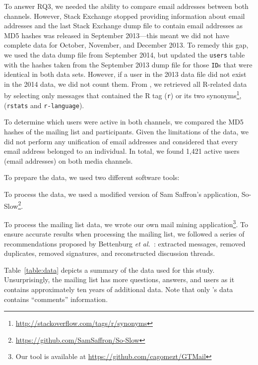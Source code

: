     
To answer RQ3, we needed the ability to compare email addresses between both channels. However, Stack Exchange stopped providing information about email addresses and the last Stack Exchange dump file to contain email addresses as MD5 hashes was released in September 2013---this meant we did not have complete data for October, November, and December 2013. 
To remedy this gap, we used the data dump file from September 2014, but updated the \texttt{users} table with the hashes taken from the September 2013 dump file for those \texttt{ID}s that were identical in both data sets.
However, if a user in the 2013 data file did not exist in the 2014 data, we did not count them.
From \SO, we retrieved all R-related data by selecting only messages that contained the R tag (\texttt{r}) or its two synonyms\footnote{\url{http://stackoverflow.com/tags/r/synonyms}}, (\texttt{rstats} and \texttt{r-language}).

To determine which users were active in both channels, we compared the MD5 hashes of the \RH mailing list and \SO participants. Given the limitations of the \SO data, we did not perform any unification of email addresses and considered that every email address belonged to an individual. In total, we found 1,421 active users (email addresses) on both media channels.


To prepare the data, we used two different software tools:
    \begin{enumerate*}[label=(\arabic*)]
    \item To process the \SO data, we used a modified version of Sam Saffron's application, So-Slow\footnote{\url{https://github.com/SamSaffron/So-Slow}}.
    \item To process the \RH mailing list data, we wrote our own mail mining application\footnote{Our tool is available at
            \url{https://github.com/cagomezt/GTMail}}. To ensure accurate results when processing the \RH mailing list, we followed a series of recommendations proposed by Bettenburg \textit{et al.}~\cite{Bettenburg2009}: extracted messages, removed duplicates, removed signatures, and reconstructed discussion threads.
    \end{enumerate*}
Table~\ref{table:data} depicts a summary of the data used for this study. Unsurprisingly, the \RH mailing list has more questions, answers, and users as it contains approximately ten years of additional data.
Note that only \SO's data contains ``comments'' information.

